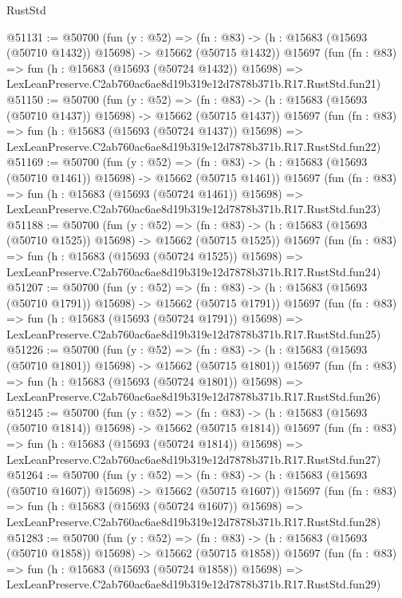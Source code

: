 \begin{lexlean}{RustStd}
\begin{coremodule}
@51131 := @50700
    (fun (y : @52) =>
    (fn : @83) -> (h : @15683 (@15693 (@50710 @1432)) @15698) -> @15662 (@50715 @1432))
    @15697
    (fun (fn : @83) =>
    fun (h : @15683 (@15693 (@50724 @1432)) @15698) =>
    LexLeanPreserve.C2ab760ac6ae8d19b319e12d7878b371b.R17.RustStd.fun21)
@51150 := @50700
    (fun (y : @52) =>
    (fn : @83) -> (h : @15683 (@15693 (@50710 @1437)) @15698) -> @15662 (@50715 @1437))
    @15697
    (fun (fn : @83) =>
    fun (h : @15683 (@15693 (@50724 @1437)) @15698) =>
    LexLeanPreserve.C2ab760ac6ae8d19b319e12d7878b371b.R17.RustStd.fun22)
@51169 := @50700
    (fun (y : @52) =>
    (fn : @83) -> (h : @15683 (@15693 (@50710 @1461)) @15698) -> @15662 (@50715 @1461))
    @15697
    (fun (fn : @83) =>
    fun (h : @15683 (@15693 (@50724 @1461)) @15698) =>
    LexLeanPreserve.C2ab760ac6ae8d19b319e12d7878b371b.R17.RustStd.fun23)
@51188 := @50700
    (fun (y : @52) =>
    (fn : @83) -> (h : @15683 (@15693 (@50710 @1525)) @15698) -> @15662 (@50715 @1525))
    @15697
    (fun (fn : @83) =>
    fun (h : @15683 (@15693 (@50724 @1525)) @15698) =>
    LexLeanPreserve.C2ab760ac6ae8d19b319e12d7878b371b.R17.RustStd.fun24)
@51207 := @50700
    (fun (y : @52) =>
    (fn : @83) -> (h : @15683 (@15693 (@50710 @1791)) @15698) -> @15662 (@50715 @1791))
    @15697
    (fun (fn : @83) =>
    fun (h : @15683 (@15693 (@50724 @1791)) @15698) =>
    LexLeanPreserve.C2ab760ac6ae8d19b319e12d7878b371b.R17.RustStd.fun25)
@51226 := @50700
    (fun (y : @52) =>
    (fn : @83) -> (h : @15683 (@15693 (@50710 @1801)) @15698) -> @15662 (@50715 @1801))
    @15697
    (fun (fn : @83) =>
    fun (h : @15683 (@15693 (@50724 @1801)) @15698) =>
    LexLeanPreserve.C2ab760ac6ae8d19b319e12d7878b371b.R17.RustStd.fun26)
@51245 := @50700
    (fun (y : @52) =>
    (fn : @83) -> (h : @15683 (@15693 (@50710 @1814)) @15698) -> @15662 (@50715 @1814))
    @15697
    (fun (fn : @83) =>
    fun (h : @15683 (@15693 (@50724 @1814)) @15698) =>
    LexLeanPreserve.C2ab760ac6ae8d19b319e12d7878b371b.R17.RustStd.fun27)
@51264 := @50700
    (fun (y : @52) =>
    (fn : @83) -> (h : @15683 (@15693 (@50710 @1607)) @15698) -> @15662 (@50715 @1607))
    @15697
    (fun (fn : @83) =>
    fun (h : @15683 (@15693 (@50724 @1607)) @15698) =>
    LexLeanPreserve.C2ab760ac6ae8d19b319e12d7878b371b.R17.RustStd.fun28)
@51283 := @50700
    (fun (y : @52) =>
    (fn : @83) -> (h : @15683 (@15693 (@50710 @1858)) @15698) -> @15662 (@50715 @1858))
    @15697
    (fun (fn : @83) =>
    fun (h : @15683 (@15693 (@50724 @1858)) @15698) =>
    LexLeanPreserve.C2ab760ac6ae8d19b319e12d7878b371b.R17.RustStd.fun29)

\end{coremodule}
\end{lexlean}
